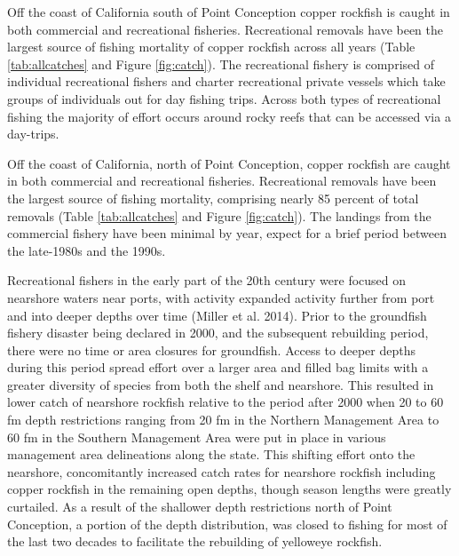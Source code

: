 \documentclass[11pt,
  english,
  a4paper,
]{article}
\begin{document}
\leavevmode\tagmcend\tagstructend


Off the coast of California south of Point Conception copper rockfish is caught in both commercial and recreational fisheries. Recreational removals have been the largest source of fishing mortality of copper rockfish across all years (Table \ref{tab:allcatches} and Figure \ref{fig:catch}). The recreational fishery is comprised of individual recreational fishers and charter recreational private vessels which take groups of individuals out for day fishing trips. Across both types of recreational fishing the majority of effort occurs around rocky reefs that can be accessed via a day-trips.

\leavevmode\tagmcend\tagstructend\par


Off the coast of California, north of Point Conception, copper rockfish are caught in both commercial and recreational fisheries. Recreational removals have been the largest source of fishing mortality, comprising nearly 85 percent of total removals (Table \ref{tab:allcatches} and Figure \ref{fig:catch}). The landings from the commercial fishery have been minimal by year, expect for a brief period between the late-1980s and the 1990s.

\leavevmode\tagmcend\tagstructend\par


Recreational fishers in the early part of the 20th century were focused on nearshore waters near ports, with activity expanded activity further from port and into deeper depths over time {(Miller et al. 2014)\leavevmode\tagmcend\tagstructend}. Prior to the groundfish fishery disaster being declared in 2000, and the subsequent rebuilding period, there were no time or area closures for groundfish. Access to deeper depths during this period spread effort over a larger area and filled bag limits with a greater diversity of species from both the shelf and nearshore. This resulted in lower catch of nearshore rockfish relative to the period after 2000 when 20 to 60 fm depth restrictions ranging from 20 fm in the Northern Management Area to 60 fm in the Southern Management Area were put in place in various management area delineations along the state. This shifting effort onto the nearshore, concomitantly increased catch rates for nearshore rockfish including copper rockfish in the remaining open depths, though season lengths were greatly curtailed. As a result of the shallower depth restrictions north of Point Conception, a portion of the depth distribution, was closed to fishing for most of the last two decades to facilitate the rebuilding of yelloweye rockfish.
\end{document}
